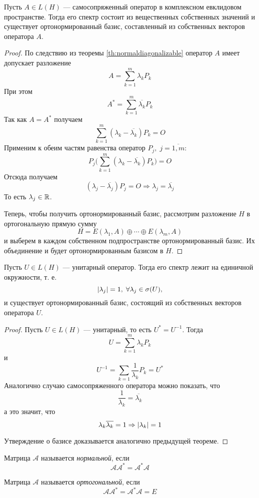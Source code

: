 \begin{theorem}
    Пусть $A \in L(H)$ --- самосопряженный оператор в комплексном евклидовом
    пространстве. Тогда его спектр состоит из вещественных собственных значений
    и существует ортонормированный базис, составленный из собственных векторов
    оператора $A$.
\end{theorem}

\begin{proof}
    По следствию из теоремы \ref{th:normaldiagonalizable} оператор $A$
    имеет допускает разложение
    \[ A = \sum_{k=1}^m \lambda_k P_k \]
    При этом
    \[ A^* = \sum_{k=1}^m \overline{\lambda_k} P_k \]
    Так как $A = A^*$ получаем
    \[ \sum_{k=1}^m (\lambda_k - \overline{\lambda_k}) P_k = O \]
    Применим к обеим частям равенства оператор $P_j, \; j = \overline{1,m}$:
    \[ P_j \bigg( \sum_{k=1}^m (\lambda_k - \overline{\lambda_k}) P_k \bigg) = O
    \]
    Отсюда получаем
    \[ (\lambda_j - \overline{\lambda_j}) P_j = O \Rightarrow \lambda_j =
    \overline{\lambda_j} \]
    То есть $\lambda_j \in \mathbb{R}$.

    Теперь, чтобы получить ортонормированный базис, рассмотрим разложение $H$ в
    ортогональную прямую сумму
    \[ H = E(\lambda_1, A) \oplus \dotsb \oplus E(\lambda_m, A) \]
    и выберем в каждом собственном подпространстве ортонормированный базис. Их
    объединение и будет ортонормированным базисом в $H$.
\end{proof}

\begin{theorem}
    Пусть $U \in L(H)$ --- унитарный оператор. Тогда его спектр лежит на
    единичной окружности, т. е. \[\left|\lambda_j\right| = 1, \; \forall \lambda_j \in
    \operatorname{\sigma}(U),\] и существует ортонормированный базис, состоящий из
    собственных векторов оператора $U$.
\end{theorem}

\begin{proof}
    Пусть $U \in L(H)$ --- унитарный, то есть $U^* = U^{-1}$. Тогда
    \[ U = \sum_{k=1}^m \lambda_k P_k \]
    и
    \[ U^{-1} = \sum_{k=1} \frac{1}{\lambda_k} P_k = U^* \]
    Аналогично случаю самосопряженного оператора можно показать, что
    \[ \frac{1}{\lambda_k} = \overline{\lambda_k} \]
    а это значит, что
    \[ \lambda_k \overline{\lambda_k} = 1 \Rightarrow \left|\lambda_k\right| = 1 \]

    Утверждение о базисе доказывается аналогично предыдущей теореме.
\end{proof}

\begin{definition}
    Матрица $\mathcal{A}$ называется \emph{нормальной}, если 
    \[\mathcal{A} \mathcal{A}^* = \mathcal{A}^*\! \mathcal{A} \]
\end{definition}

\begin{definition}
    Матрица $\mathcal{A}$ называется \emph{ортогональной}, если 
    \[\mathcal{A} \mathcal{A}^* = \mathcal{A}^*\! \mathcal{A} = E \]
\end{definition}
